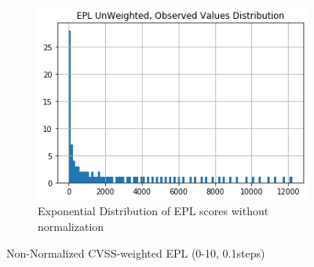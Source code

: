 \begin{figure}
\begin{subfigure}[t]{0.48\textwidth}
        \includegraphics[width=\linewidth]{output_37_3.png}
        \caption{Exponential Distribution of EPL scores without normalization}
        \label{fig:automation:results:epl_scores_unnorm}
    \end{subfigure}
    \hfill
    \caption{Non-Normalized CVSS-weighted EPL (0-10, 0.1steps)}
    \label{fig:automation:results:epl_unnorm}
\end{figure}
